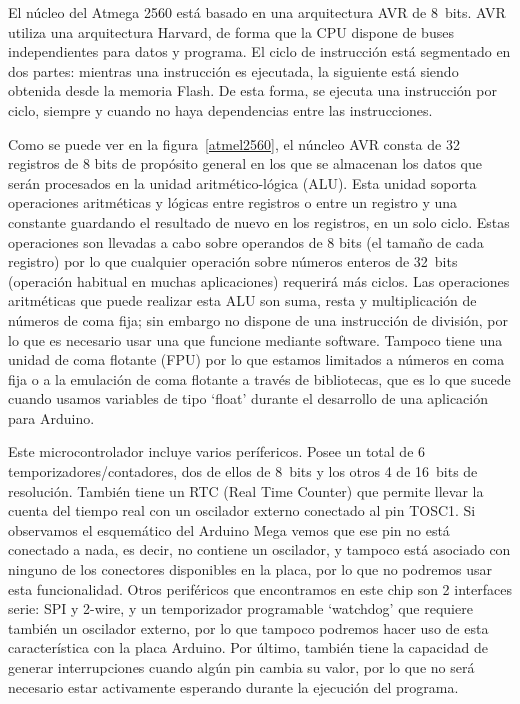 El núcleo del Atmega 2560 está basado en una arquitectura AVR de 8~bits. AVR utiliza una arquitectura Harvard, de forma que la CPU dispone de buses independientes para datos y programa. El ciclo de instrucción está segmentado en dos partes: mientras una instrucción es ejecutada, la siguiente está siendo obtenida desde la memoria Flash. De esta forma, se ejecuta una instrucción por ciclo, siempre y cuando no haya dependencias entre las instrucciones.


Como se puede ver en la figura~\ref{atmel2560}, el núncleo AVR consta de 32 registros de 8 bits de propósito general en los que se almacenan los datos que serán procesados en la unidad aritmético-lógica (ALU). Esta unidad soporta operaciones aritméticas y lógicas entre registros o entre un registro y una constante guardando el resultado de nuevo en los registros, en un solo ciclo. Estas operaciones son llevadas a cabo sobre operandos de 8 bits (el tamaño de cada registro) por lo que cualquier operación sobre números enteros de 32~bits (operación habitual en muchas aplicaciones) requerirá más ciclos. Las operaciones aritméticas que puede realizar esta ALU son suma, resta y multiplicación de números de coma fija; sin embargo no dispone de una instrucción de división, por lo que es necesario usar una que funcione mediante software. Tampoco tiene una unidad de coma flotante (FPU) por lo que estamos limitados a números en coma fija o a la emulación de coma flotante a través de bibliotecas, que es lo que sucede cuando usamos variables de tipo `float' durante el desarrollo de una aplicación para Arduino.

Este microcontrolador incluye varios perífericos. Posee un total de 6 temporizadores/contadores, dos de ellos de 8~bits y los otros 4 de 16~bits de resolución. También tiene un RTC (Real Time Counter) que permite llevar la cuenta del tiempo real con un oscilador externo conectado al pin TOSC1. Si observamos el esquemático del Arduino Mega vemos que ese pin no está conectado a nada, es decir, no contiene un oscilador, y tampoco está asociado con ninguno de los conectores disponibles en la placa, por lo que no podremos usar esta funcionalidad. Otros periféricos que encontramos en este chip son 2 interfaces serie: SPI y 2-wire, y un temporizador programable `watchdog' que requiere también un oscilador externo, por lo que tampoco podremos hacer uso de esta característica con la placa Arduino. Por último, también tiene la capacidad de generar interrupciones cuando algún pin cambia su valor, por lo que no será necesario estar activamente esperando durante la ejecución del programa.

